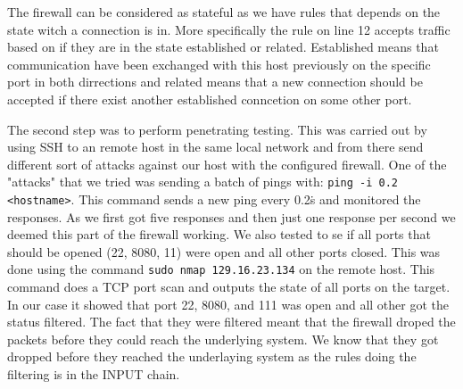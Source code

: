 The firewall can be considered as stateful as we have rules that depends on the state witch a connection is in. More specifically the rule on line 12 accepts traffic based on if they are in the state established or related. Established means that communication have been exchanged with this host previously on the specific port in both dirrections and related means that a new connection should be accepted if there exist another established conncetion on some other port.

The second step was to perform penetrating testing. This was carried out by using SSH to an remote host in the same local network and from there send different sort of attacks against our host with the configured firewall. One of the "attacks" that we tried was sending a batch of pings with: \texttt{ping -i 0.2 <hostname>}. This command sends a new ping every 0.2\.s and monitored the responses. As we first got five responses and then just one response per second we deemed this part of the firewall working. We also tested to se if all ports that should be opened (22, 8080, 11) were open and all other ports closed. This was done using the command \texttt{sudo nmap 129.16.23.134} on the remote host. This command does a TCP port scan and outputs the state of all ports on the target. In our case it showed that port 22, 8080, and 111 was open and all other got the status filtered. The fact that they were filtered meant that the firewall droped the packets before they could reach the underlying system. We know that they got dropped before they reached the underlaying system as the rules doing the filtering is in the INPUT chain.
